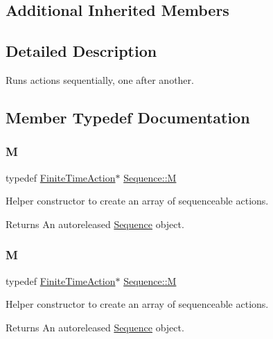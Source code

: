 \subsection*{Additional Inherited Members}


\subsection{Detailed Description}
Runs actions sequentially, one after another. 

\subsection{Member Typedef Documentation}
\mbox{\label{classSequence_a6f34f8a978819442ffa4e9517ed49c10}} 
\subsubsection{\texorpdfstring{M}{M}\hspace{0.1cm}{\footnotesize\ttfamily [1/2]}}
{\footnotesize\ttfamily typedef \hyperlink{classFiniteTimeAction}{Finite\+Time\+Action}$\ast$ \hyperlink{classSequence_a6f34f8a978819442ffa4e9517ed49c10}{Sequence\+::M}}

Helper constructor to create an array of sequenceable actions.

\begin{DoxyReturn}{Returns}
An autoreleased \hyperlink{classSequence}{Sequence} object. 
\end{DoxyReturn}
\mbox{\label{classSequence_a6f34f8a978819442ffa4e9517ed49c10}} 
\subsubsection{\texorpdfstring{M}{M}\hspace{0.1cm}{\footnotesize\ttfamily [2/2]}}
{\footnotesize\ttfamily typedef \hyperlink{classFiniteTimeAction}{Finite\+Time\+Action}$\ast$ \hyperlink{classSequence_a6f34f8a978819442ffa4e9517ed49c10}{Sequence\+::M}}

Helper constructor to create an array of sequenceable actions.

\begin{DoxyReturn}{Returns}
An autoreleased \hyperlink{classSequence}{Sequence} object. 
\end{DoxyReturn}


